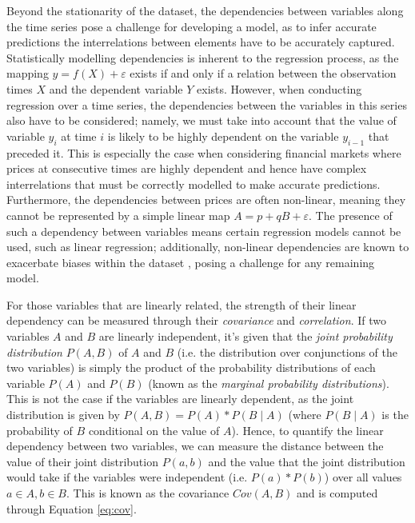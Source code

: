\documentclass[a4paper, 11pt]{article}
\begin{document}
    Beyond the stationarity of the dataset, the dependencies between variables along the time series pose a challenge for developing a model, as to infer accurate predictions the interrelations between elements have to be accurately captured. Statistically modelling dependencies is inherent to the regression process, as the mapping $y = f\left(X\right) + \varepsilon$ exists if and only if a relation between the observation times $X$ and the dependent variable $Y$ exists. However, when conducting regression over a time series, the dependencies between the variables in this series also have to be considered; namely, we must take into account that the value of variable $y_i$ at time $i$ is likely to be highly dependent on the variable $y_{i-1}$ that preceded it. This is especially the case when considering financial markets where prices at consecutive times are highly dependent and hence have complex interrelations that must be correctly modelled to make accurate predictions. Furthermore, the dependencies between prices are often non-linear, meaning they cannot be represented by a simple linear map $A = p + qB + \varepsilon$. The presence of such a dependency between variables means certain regression models cannot be used, such as linear regression; additionally, non-linear dependencies are known to exacerbate biases within the dataset \cite{phillips-2007}, posing a challenge for any remaining model.

    For those variables that are linearly related, the strength of their linear dependency can be measured through their \emph{covariance} and \emph{correlation}. If two variables $A$ and $B$ are linearly independent, it's given that the \emph{joint probability distribution} $P(A, B)$ of $A$ and $B$ (i.e. the distribution over conjunctions of the two variables) is simply the product of the probability distributions of each variable $P(A)$ and $P(B)$ (known as the \emph{marginal probability distributions}). This is not the case if the variables are linearly dependent, as the joint distribution is given by $P(A, B) = P(A) * P(B \mid A)$ (where $P(B \mid A)$ is the probability of $B$ conditional on the value of $A$). Hence, to quantify the linear dependency between two variables, we can measure the distance between the value of their joint distribution $P(a, b)$ and the value that the joint distribution would take if the variables were independent (i.e. $P(a) * P(b)$) over all values $a \in A, b \in B$. This is known as the covariance $Cov(A, B)$ and is computed through Equation \ref{eq:cov}.
\end{document}
